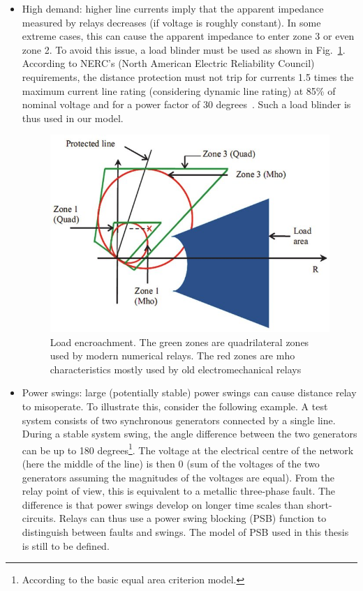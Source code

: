 \begin{itemize}
    \item High demand: higher line currents imply that the apparent impedance measured by relays decreases (if voltage is roughly constant). In some extreme cases, this can cause the apparent impedance to enter zone 3 or even zone 2. To avoid this issue, a load blinder must be used as shown in Fig.~\ref{fig:encroachment}. According to NERC's (North American Electric Reliability Council) requirements, the distance protection must not trip for currents 1.5 times the maximum current line rating (considering dynamic line rating) at 85\% of nominal voltage and for a power factor of 30 degrees~\cite{PSRCreportProtectionMisop}. Such a load blinder is thus used in our model.
\begin{figure}
    \centering
    \includegraphics[width=0.8\linewidth]{Figs/LoadEncroachment.jpg}
    \caption{Load encroachment. The green zones are quadrilateral zones used by modern numerical relays. The red zones are mho characteristics mostly used by old electromechanical relays~\cite{LoadEncroachmentFig}}
    \label{fig:encroachment}
\end{figure}
    \item Power swings: large (potentially stable) power swings can cause distance relay to misoperate. To illustrate this, consider the following example. A test system consists of two synchronous generators connected by a single line. During a stable system swing, the angle difference between the two generators can be up to 180 degrees\footnote{According to the basic equal area criterion model.}. The voltage at the electrical centre of the network (here the middle of the line) is then 0 (sum of the voltages of the two generators assuming the magnitudes of the voltages are equal). From the relay point of view, this is equivalent to a metallic three-phase fault. The difference is that power swings develop on longer time scales than short-circuits. Relays can thus use a power swing blocking (PSB) function to distinguish between faults and swings. The model of PSB used in this thesis is still to be defined.

\end{itemize}
